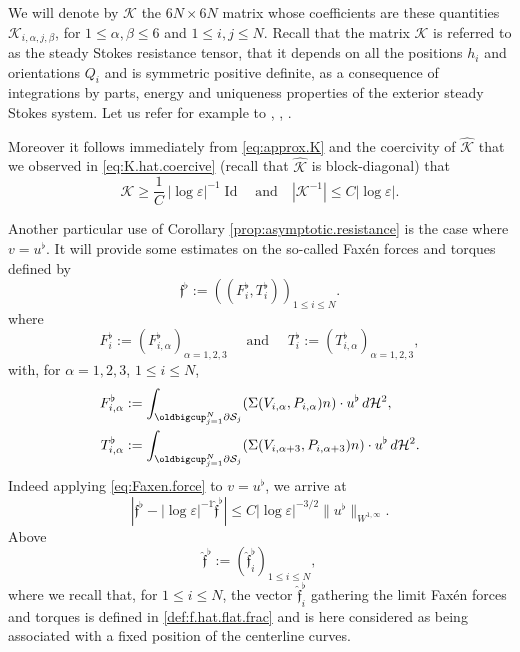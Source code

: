 \documentclass[JEP,XML,SOM,Unicode, NoEqCountersInSection,NoFloatCountersInSection,published]{cedram}
\let\eps\varepsilon
\DeclareMathOperator{\Id}{Id}
\theoremstyle{definition}
\theoremstyle{remark}
\begin{document}
We will denote by $\mathcal K$ the $6N \times 6N$ matrix whose coefficients are these quantities $\mathcal K_{i,\alpha,j,\beta}$, for $1 \leq \alpha,\beta \leq 6$ and $1 \leq i,j \leq N$.
Recall that the matrix $\mathcal K$ is referred to as the steady Stokes resistance tensor, that it depends on all the positions $h_i$ and orientations $Q_i$ and is symmetric positive definite, as a consequence of integrations by parts, energy and uniqueness properties of the exterior steady Stokes system. Let us refer for example to \cite[Chap.\,2]{Kim-Karilla}, \cite[Chap.\,5]{Galdi}, \cite[Chap.\,2 \& 3]{Lady}.

Moreover it follows immediately from \eqref{eq:approx.K} and the coercivity of $\hat{\mathcal K}$ that we observed in \eqref{eq:K.hat.coercive} (recall that $\hat{\mathcal K}$ is block-diagonal) that
\begin{equation}
\mathcal K \geq \frac1C\, \left|\log \eps\right|^{-1} \Id \quad \text{and} \quad | \mathcal K^{-1} |
\leq C {\left|\log \eps\right|}.
\label{eq:K.coercive}
\end{equation}

Another particular use of Corollary \ref{prop:asymptotic.resistance}
is the case where $v=u^\flat$.
It will provide some estimates on the so-called Faxén forces and torques defined by
\begin{equation}\label{clour}
\mathfrak{f}^\flat := ((F^\flat_{i},T^\flat_{i}))_{1 \leq i \leq N}.
\end{equation}
where
\begin{equation}
\label{fab3}
F^\flat_{i} := (F^\flat_{i,\alpha})_{\alpha=1,2,3} \quad \text{ and } \quad T^\flat_{i} := (T^\flat_{i,\alpha})_{\alpha=1,2,3},
\end{equation}
with, for $\alpha=1,2,3$, $1\leq i \leq N$,
\begin{align}
\label{fab1}
F^\flat_{i,\alpha} &:=
\int_{\oldbigcup_{j=1}^N \partial \mathcal S_j } (\Sigma (V_{i,\alpha}, P_{i,\alpha}) n) \cdot u^\flat \, d\mathcal{H}^2,
\\ \label{fab2}
T^\flat_{i,\alpha} &:=
\int_{\oldbigcup_{j=1}^N \partial \mathcal S_j } (\Sigma (V_{i, \alpha +3 }, P_{i, \alpha+3}) n) \cdot u^\flat \, d\mathcal{H}^2.
\end{align}
Indeed
applying \eqref{eq:Faxen.force} to $v=u^\flat$, we arrive at
\begin{equation} \label{ofint}
| \mathfrak{f}^\flat -\left|\log \eps\right|^{-1} \hat{\mathfrak f}^\flat|
\leq C \left|\log \eps\right|^{-3/2} \|u^\flat\|_{W^{1,\infty}}.
\end{equation}
Above
\[
{\hat{\mathfrak{f}}^\flat }
:= (\hat{\mathfrak{f}}_i^\flat)_{1 \leq i \leq N}, \]
where we recall that, for $1 \leq i \leq N$, the vector $\hat{\mathfrak{f}}^\flat_{i} $ gathering the limit Faxén forces and torques is defined in \eqref{def:f.hat.flat.frac} and is here considered as {being} associated with a fixed position of the centerline curves.
\end{document}
